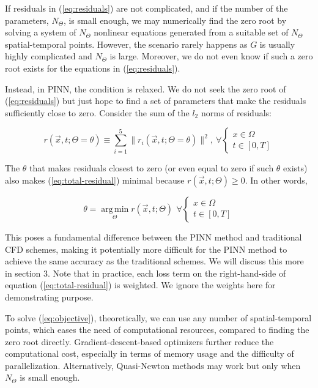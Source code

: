 If residuals in (\ref{eq:residuals}) are not complicated, and if the number of the parameters, $N_\Theta$, is small enough, we may numerically find the zero root by solving a system of $N_\Theta$ nonlinear equations generated from a suitable set of $N_\Theta$ spatial-temporal points.
However, the scenario rarely happens as $G$ is usually highly complicated and $N_\Theta$ is large.
Moreover, we do not even know if such a zero root exists for the equations in (\ref{eq:residuals}).

Instead, in PINN, the condition is relaxed.
We do not seek the zero root of (\ref{eq:residuals}) but just hope to find a set of parameters that make the residuals sufficiently close to zero.
Consider the sum of the $l_2$ norms of residuals:

\begin{equation}\label{eq:total-residual}
    r(\vec{x}, t; \Theta=\theta) \equiv \sum\limits_{i=1}^{5} \lVert r_i(\vec{x}, t; \Theta=\theta) \rVert^2,\ \forall \left\{\begin{array}{l}x \in \Omega \\ t\in[0, T]\end{array}\right.
\end{equation}

The $\theta$ that makes residuals closest to zero (or even equal to zero if such $\theta$ exists) also makes (\ref{eq:total-residual}) minimal because $r(\vec{x}, t; \Theta) \ge 0$.
In other words,

\begin{equation}\label{eq:objective}
    \theta = \operatorname*{arg\,min}\limits_{\Theta} r(\vec{x}, t; \Theta)\,\ \forall \left\{\begin{array}{l}x \in \Omega \\ t\in[0, T]\end{array}\right.
\end{equation}

This poses a fundamental difference between the PINN method and traditional CFD schemes, making it potentially more difficult for the PINN method to achieve the same accuracy as the traditional schemes.
We will discuss this more in section 3.
Note that in practice, each loss term on the right-hand-side of equation (\ref{eq:total-residual}) is weighted.
We ignore the weights here for demonstrating purpose. 

To solve (\ref{eq:objective}), theoretically, we can use any number of spatial-temporal points, which eases the need of computational resources, compared to finding the zero root directly.
Gradient-descent-based optimizers further reduce the computational cost, especially in terms of memory usage and the difficulty of parallelization.
Alternatively, Quasi-Newton methods may work but only when $N_\Theta$ is small enough.

